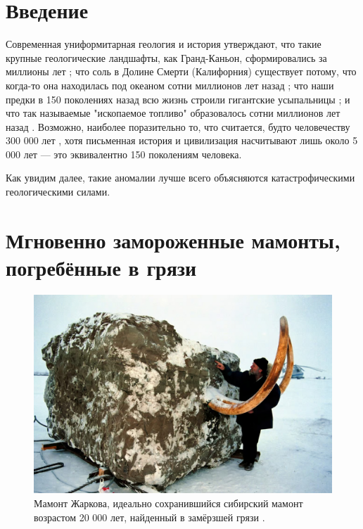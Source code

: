 \documentclass[10pt,twocolumn,letterpaper]{article}
\begin{document}

\section{Введение}

Современная униформитарная геология и история утверждают, что такие крупные геологические ландшафты, как Гранд-Каньон, сформировались за миллионы лет \cite{143}; что соль в Долине Смерти (Калифорния) существует потому, что когда-то она находилась под океаном сотни миллионов лет назад \cite{144}; что наши предки в 150 поколениях назад всю жизнь строили гигантские усыпальницы \cite{29,70}; и что так называемые "ископаемое топливо" образовалось сотни миллионов лет назад \cite{104}. Возможно, наиболее поразительно то, что считается, будто человечеству 300 000 лет \cite{145}, хотя письменная история и цивилизация насчитывают лишь около 5 000 лет — это эквивалентно 150 поколениям человека.

Как увидим далее, такие аномалии лучше всего объясняются катастрофическими геологическими силами.

\section{Мгновенно замороженные мамонты, погребённые в грязи}

\begin{figure}[t]
\begin{center}
   \includegraphics[width=1\linewidth]{jarkov-mammoth.jpg}
\end{center}
   \caption{Мамонт Жаркова, идеально сохранившийся сибирский мамонт возрастом 20 000 лет, найденный в замёрзшей грязи \cite{51}.}
\label{fig:1}
\label{fig:onecol}
\end{figure}
\end{document}
